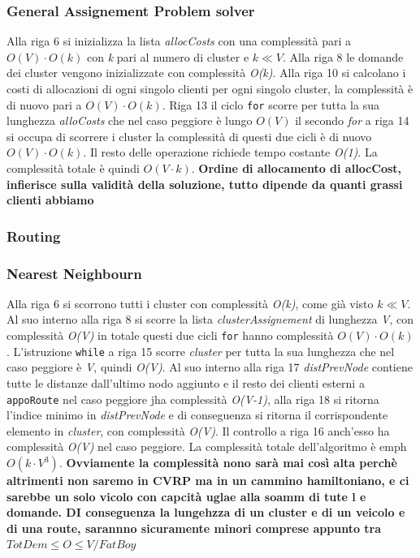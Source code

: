 \documentclass[]{article}
\begin{document}
\subsubsection{General Assignement Problem solver}
Alla riga 6 si inizializza la lista \textit{allocCosts} con una complessità  pari a \emph{$O(V) \cdot O(k)$} con \emph{k} pari al numero di cluster e \emph{$ k \ll V $}. Alla riga 8 le domande dei cluster vengono inizializzate con complessità \emph{O(k)}. Alla riga 10 si calcolano i costi di allocazioni di ogni singolo clienti per ogni singolo cluster, la complessità è di nuovo  pari a \emph{$O(V) \cdot O(k)$}. Riga 13 il ciclo \texttt{for} scorre per tutta la sua lunghezza \textit{alloCosts} che nel caso peggiore è lungo \emph{$O(V)$} il secondo \emph{for} a riga 14 si occupa di scorrere i cluster la complessità di questi due cicli è di nuovo \emph{$O(V) \cdot O(k)$}. Il resto delle operazione richiede tempo costante \emph{O(1)}. La complessità totale è quindi \emph{$O(V \cdot k)$}.
\textbf{Ordine di allocamento di allocCost, infierisce sulla validità della soluzione, tutto dipende da quanti grassi clienti abbiamo}

\subsubsection{Routing}
 
\subsubsection{Nearest Neighbourn}
Alla riga 6 si scorrono tutti i cluster con complessità \emph{O(k)}, come già visto  \emph{$ k \ll V $}. Al suo interno  alla riga 8 si scorre la lista \textit{clusterAssignement} di lunghezza \emph{V}, con complessità \emph{O(V)} in totale questi due cicli \texttt{for} hanno complessità \emph{$O(V) \cdot O(k)$}.
L'istruzione \texttt{while} a riga 15 scorre \textit{cluster} per tutta la sua lunghezza che nel caso peggiore è \emph{V}, quindi \emph{O(V)}. Al suo interno alla riga 17 \textit{distPrevNode} contiene tutte le distanze dall'ultimo nodo aggiunto e il resto dei clienti esterni a \texttt{appoRoute} nel caso peggiore jha complessità \emph{O(V-1)}, alla riga 18 si ritorna l'indice minimo in \textit{distPrevNode} e di conseguenza si ritorna il corrispondente elemento in \textit{cluster}, con complessità \emph{O(V)}. Il controllo a riga 16 anch'esso ha complessità \emph{O(V)} nel caso peggiore. La complessità totale dell'algoritmo è 
emph{$O(k \cdot V^3)$}. 
\textbf{Ovviamente la complessità nono sarà mai così alta perchè altrimenti non saremo in CVRP ma in un cammino hamiltoniano, e ci sarebbe un solo vicolo con capcità uglae alla soamm di tute l e domande. DI conseguenza la lungehzza di un cluster e di un veicolo e di una route, sarannno sicuramente minori comprese appunto tra  \emph{$TotDem \leq O \leq V/FatBoy$} }
\end{document}
